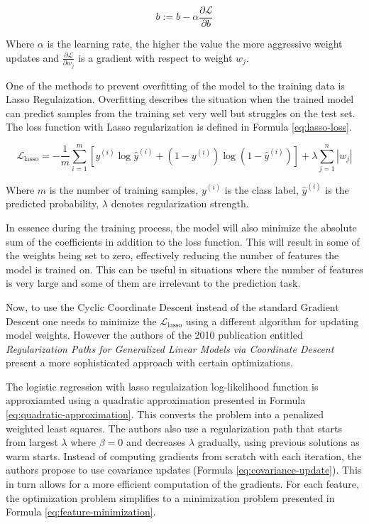 \documentclass[12pt]{article}
\begin{document}
\begin{equation}\label{eq:bias-update}
    b := b - \alpha \frac{\partial \mathcal{L}}{\partial b}
\end{equation}

Where $\alpha$ is the learning rate, the higher the value the more aggressive weight updates and $\frac{\partial \mathcal{L}}{\partial w_j}$ is a gradient with respect to weight $w_j$.


One of the methods to prevent overfitting of the model to the training data is Lasso Regulaization. Overfitting describes the situation when the trained model can predict samples from the training set very well but struggles on the test set. The loss function with Lasso regularization is defined in Formula \ref{eq:lasso-loss}.

\begin{equation}\label{eq:lasso-loss}
\mathcal{L}_{\text{lasso}} = -\frac{1}{m} \sum_{i=1}^{m} \left[ y^{(i)} \log \hat{y}^{(i)} + \left(1 - y^{(i)}\right) \log \left(1 - \hat{y}^{(i)}\right) \right] + \lambda \sum_{j=1}^{n} |w_j|
\end{equation}

Where $m$ is the number of training samples, $y^{(i)}$ is the class label, $\hat{y}^{(i)}$ is the predicted probability, $\lambda$ denotes regularization strength.

In essence during the training process, the model will also minimize the absolute sum of the coefficients in addition to the loss function. This will result in some of the weights being set to zero, effectively reducing the number of features the model is trained on. This can be useful in situations where the number of features is very large and some of them are irrelevant to the prediction task.

Now, to use the Cyclic Coordinate Descent instead of the standard Gradient Descent one needs to minimize the $\mathcal{L}_{\text{lasso}}$ using a different algorithm for updating model weights. However the authors of the 2010 publication entitled \textit{Regularization Paths for Generalized Linear Models via Coordinate Descent} \cite{Friedman2010} present a more sophisticated approach with certain optimizations.


The logistic regression with lasso regulaization log-likelihood function is approxiamted using a quadratic approximation presented in Formula \ref{eq:quadratic-approximation}. This converts the problem into a penalized weighted least squares. The authors also use a regularization path that starts from largest $\lambda$ where $\beta = 0$ and decreases $\lambda$ gradually, using previous solutions as warm starts. Instead of computing gradients from scratch with each iteration, the authors propose to use covariance updates (Formula \ref{eq:covariance-update}). This in turn allows for a more efficient computation of the gradients. For each feature, the optimization problem simplifies to a minimization problem presented in Formula \ref{eq:feature-minimization}.
\end{document}
